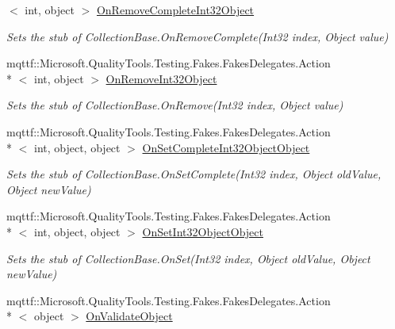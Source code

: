 \begin{DoxyCompactItemize}
$<$ int, object $>$ \hyperlink{class_system_1_1_diagnostics_1_1_fakes_1_1_stub_counter_creation_data_collection_a05aba58b4425f72aa68e2664128489bd}{On\-Remove\-Complete\-Int32\-Object}
\begin{DoxyCompactList}\small\item\em Sets the stub of Collection\-Base.\-On\-Remove\-Complete(\-Int32 index, Object value)\end{DoxyCompactList}\item 
mqttf\-::\-Microsoft.\-Quality\-Tools.\-Testing.\-Fakes.\-Fakes\-Delegates.\-Action\\*
$<$ int, object $>$ \hyperlink{class_system_1_1_diagnostics_1_1_fakes_1_1_stub_counter_creation_data_collection_afb8c8e9e3195aa890611b53b2dd6eff6}{On\-Remove\-Int32\-Object}
\begin{DoxyCompactList}\small\item\em Sets the stub of Collection\-Base.\-On\-Remove(\-Int32 index, Object value)\end{DoxyCompactList}\item 
mqttf\-::\-Microsoft.\-Quality\-Tools.\-Testing.\-Fakes.\-Fakes\-Delegates.\-Action\\*
$<$ int, object, object $>$ \hyperlink{class_system_1_1_diagnostics_1_1_fakes_1_1_stub_counter_creation_data_collection_a331ab801d74682efcaca2f9ecfc1cb85}{On\-Set\-Complete\-Int32\-Object\-Object}
\begin{DoxyCompactList}\small\item\em Sets the stub of Collection\-Base.\-On\-Set\-Complete(\-Int32 index, Object old\-Value, Object new\-Value)\end{DoxyCompactList}\item 
mqttf\-::\-Microsoft.\-Quality\-Tools.\-Testing.\-Fakes.\-Fakes\-Delegates.\-Action\\*
$<$ int, object, object $>$ \hyperlink{class_system_1_1_diagnostics_1_1_fakes_1_1_stub_counter_creation_data_collection_a60e22ee186abfcd9d5ca43776578bba0}{On\-Set\-Int32\-Object\-Object}
\begin{DoxyCompactList}\small\item\em Sets the stub of Collection\-Base.\-On\-Set(\-Int32 index, Object old\-Value, Object new\-Value)\end{DoxyCompactList}\item 
mqttf\-::\-Microsoft.\-Quality\-Tools.\-Testing.\-Fakes.\-Fakes\-Delegates.\-Action\\*
$<$ object $>$ \hyperlink{class_system_1_1_diagnostics_1_1_fakes_1_1_stub_counter_creation_data_collection_afd6dfd0f56ae139dabe9c9c21a87f2f9}{On\-Validate\-Object}

\end{DoxyCompactItemize}
